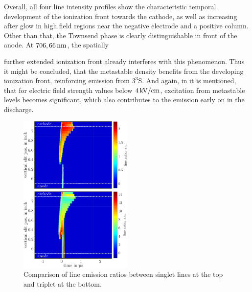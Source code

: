 \documentclass[a4paper,10pt,twoside]{article}
\begin{document}
\begin{multicols*}{2}
		Overall, all four line intensity profiles show the characteristic temporal development of the ionization front towards the cathode, as well as increasing after glow in high field regions near the negative electrode and a positive column. Other than that, the Townsend phase is clearly distinguishable in front of the anode. At $\unit[706,66]{nm}$, the spatially
		
	\end{multicols*}
	
	\twocolumn
	
		further extended ionization front already interferes with this phenomenon. Thus it might be concluded, that the metastable density benefits from the developing ionization front, reinforcing emission from $3^3$S. And again, in \cite{linratio1_14} it is mentioned, that for electric field strength values below $\unit[4]{kV/cm}$, excitation from metastable levels becomes significant, which also contributes to the emission early on in the discharge.
		
			\begin{figure}[t!]
				\centering
				\includegraphics[width=0.5\textwidth]{figures/lineratio/combinations/lineratio667over706.pdf}
				\caption{Comparison of line emission ratios between singlet lines at the top and triplet at the bottom.}
				\label{img:comparisonlineratio}
			\end{figure}
		
\end{document}
